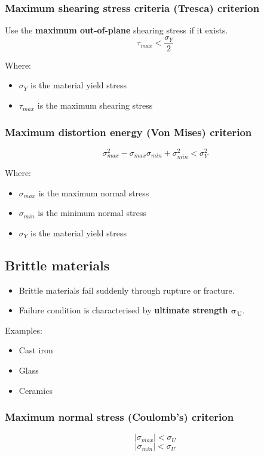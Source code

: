\documentclass[11pt]{article}
\begin{document}
\subsubsection{Maximum shearing stress criteria (Tresca) criterion}
\label{sec:orgac3a1d0}
Use the \textbf{maximum out-of-plane} shearing stress if it exists.
\[\tau_{max} < \frac{\sigma_Y}{2}\]

Where:
\begin{itemize}
\item \(\sigma_Y\) is the material yield stress
\item \(\tau_{max}\) is the maximum shearing stress
\end{itemize}
\subsubsection{Maximum distortion energy (Von Mises) criterion}
\label{sec:org977dbbc}
\[\sigma_{max}^2 - \sigma_{max} \sigma_{min} + \sigma_{min}^2 < \sigma_Y^2\]

Where:
\begin{itemize}
\item \(\sigma_{max}\) is the maximum normal stress
\item \(\sigma_{min}\) is the minimum normal stress
\item \(\sigma_{Y}\) is the material yield stress
\end{itemize}

\newpage
\subsection{Brittle materials}
\label{sec:org7ab27a3}
\begin{itemize}
\item Brittle materials fail suddenly through rupture or fracture.
\item Failure condition is characterised by \textbf{ultimate strength \(\boldsymbol{\sigma_U}\)}.
\end{itemize}

Examples:
\begin{itemize}
\item Cast iron
\item Glass
\item Ceramics
\end{itemize}
\subsubsection{Maximum normal stress (Coulomb's) criterion}
\label{sec:orge55f47e}
\[|\sigma_{max}| < \sigma_U\]
\[|\sigma_{min}| < \sigma_U\]
\end{document}
